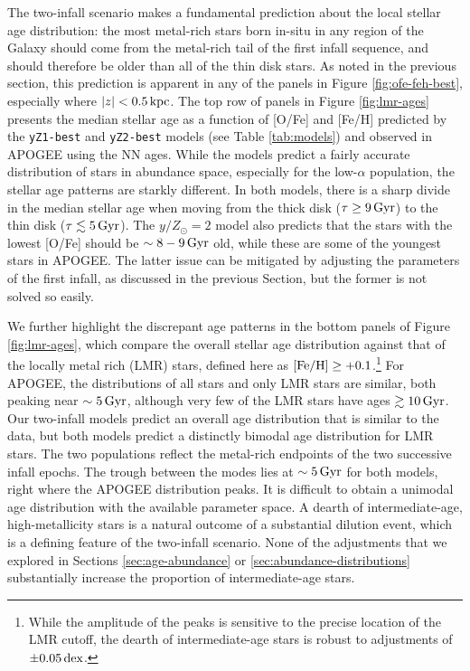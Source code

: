 \documentclass[twocolumn,twocolappendix,linenumbers]{aastex631}
\newcommand{\mathFeH}{{\rm [Fe/H]}}
\newcommand{\yZ}[1]{$y/Z_\odot=#1$}
\newcommand{\kpc}{\,{\rm kpc}}
\newcommand{\Gyr}{\,{\rm Gyr}}
\newcommand{\dex}{\,{\rm dex}}
\begin{document}
The two-infall scenario makes a fundamental prediction about the local stellar age distribution: the most metal-rich stars born in-situ in any region of the Galaxy should come from the metal-rich tail of the first infall sequence, and should therefore be older than all of the thin disk stars. As noted in the previous section, this prediction is apparent in any of the panels in Figure \ref{fig:ofe-feh-best}, especially where $|z|<0.5\kpc$. The top row of panels in Figure \ref{fig:lmr-ages} presents the median stellar age as a function of [O/Fe] and [Fe/H] predicted by the {\tt yZ1-best} and {\tt yZ2-best} models (see Table \ref{tab:models}) and observed in APOGEE using the \citet{leung_variational_2023} NN ages. While the models predict a fairly accurate distribution of stars in abundance space, especially for the low-$\alpha$ population, the stellar age patterns are starkly different. In both models, there is a sharp divide in the median stellar age when moving from the thick disk ($\tau\ge9\Gyr$) to the thin disk ($\tau\lesssim5\Gyr$). The \yZ{2} model also predicts that the stars with the lowest [O/Fe] should be $\sim8-9\Gyr$ old, while these are some of the youngest stars in APOGEE. The latter issue can be mitigated by adjusting the parameters of the first infall, as discussed in the previous Section, but the former is not solved so easily.

We further highlight the discrepant age patterns in the bottom panels of Figure \ref{fig:lmr-ages}, which compare the overall stellar age distribution against that of the locally metal rich (LMR) stars, defined here as $\mathFeH\ge+0.1$.\footnote{
    While the amplitude of the peaks is sensitive to the precise location of the LMR cutoff, the dearth of intermediate-age stars is robust to adjustments of $\pm0.05\dex$.
} For APOGEE, the distributions of all stars and only LMR stars are similar, both peaking near $\sim5\Gyr$, although very few of the LMR stars have ages $\gtrsim10\Gyr$. Our two-infall models predict an overall age distribution that is similar to the data, but both models predict a distinctly bimodal age distribution for LMR stars. The two populations reflect the metal-rich endpoints of the two successive infall epochs. The trough between the modes lies at $\sim5\Gyr$ for both models, right where the APOGEE distribution peaks. It is difficult to obtain a unimodal age distribution with the available parameter space. A dearth of intermediate-age, high-metallicity stars is a natural outcome of a substantial dilution event, which is a defining feature of the two-infall scenario. None of the adjustments that we explored in Sections \ref{sec:age-abundance} or \ref{sec:abundance-distributions} substantially increase the proportion of intermediate-age stars.
\end{document}
